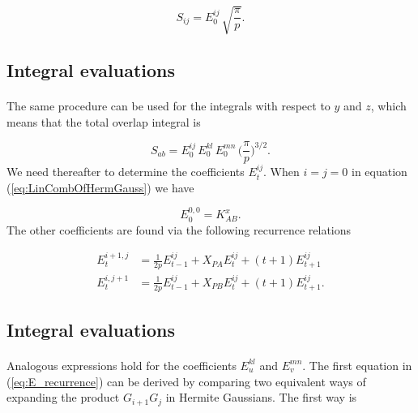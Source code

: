 \documentclass[%
twoside,                 %
final,                   %
10pt]{article}
\begin{document}
\begin{equation}
 S_{ij} = E^{ij}_0\,\sqrt{\frac{\pi}{p}}.
\end{equation}



\subsection*{Integral evaluations}

\paragraph{}

The same procedure can be used for the integrals with respect to $y$ and $z$, which means that the total overlap integral is

\begin{equation}
 S_{ab} = E^{ij}_0\,E^{kl}_0\,E^{mn}_0\,\Big(\frac{\pi}{p}\Big)^{3/2}.
\end{equation}
We need thereafter to determine the coefficients $E^{ij}_t$. When $i=j=0$ in equation (\ref{eq:LinCombOfHermGauss})
we have

\begin{equation}
 E^{0,0}_0 = K_{AB}^x.
\end{equation}
The other coefficients are found via the following recurrence relations

\begin{equation}
\label{eq:E_recurrence}
\begin{split}
 E^{i+1,j}_t & = \frac{1}{2p}E^{ij}_{t-1} + X_{PA}E^{ij}_t + (t+1)E^{ij}_{t+1} \\
 E^{i,j+1}_t & = \frac{1}{2p}E^{ij}_{t-1} + X_{PB}E^{ij}_t + (t+1)E^{ij}_{t+1}.
\end{split}
\end{equation}



\subsection*{Integral evaluations}

\paragraph{}

Analogous expressions hold for the coefficients $E^{kl}_u$ and $E^{mn}_v$. The first equation in (\ref{eq:E_recurrence}) 
can be derived by comparing two equivalent ways of expanding the product $G_{i+1}G_j$
in Hermite Gaussians. The first way is
\end{document}
